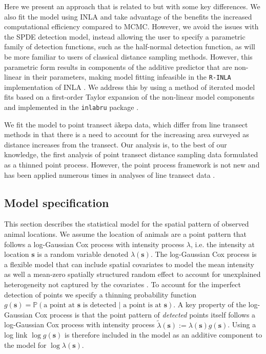 \documentclass{statsoc}
\newcommand{\bs}{\mathbf{s}}
\newcommand{\tl}{\tilde{\lambda}}   %
\newcommand{\akepa}{\textquotesingle\={a}kepa}  %
\begin{document}
Here we present an approach that is related to \citet{yuan_point_2017} but with some key differences. We also fit the model using INLA and take advantage of the benefits the increased computational efficiency compared to MCMC.  However, we avoid the issues with the SPDE detection model, instead allowing the user to specify a parametric family of detection functions, such as the half-normal detection function, as will be more familiar to users of classical distance sampling methods. However, this parametric form results in components of the additive predictor that are non-linear in their parameters, making model fitting infeasible in the \texttt{R-INLA} implementation of INLA \citep{rue_approximate_2009}.  We address this by using a method of iterated model fits based on a first-order Taylor expansion of the non-linear model components and implemented in the \texttt{inlabru} package \citep{bachl_inlabru_2019}.

We fit the model to point transect \akepa{} data, which differ from line transect methods in that there is a need to account for the increasing area surveyed as distance increases from the transect.  Our analysis is, to the best of our knowledge, the first analysis of point transect distance sampling data formulated as a thinned point process.  However, the point process framework is not new and has been applied numerous times in analyses of line transect data \citep{buckland_model-based_2016, niemi_bayesian_2010, johnson_model-based_2010, waagepetersen_likelihood-based_2006, hedley_spatial_2004,  hogmander_random_1991, stoyan_remark_1982}.

\subsection{Model specification}

This section describes the statistical model for the spatial pattern of observed animal locations. We assume the location of animals are a point pattern that follows a log-Gaussian Cox process with intensity process $\lambda$, i.e.  the intensity at location $\bs$ is a random variable denoted $\lambda(\bs)$.  The log-Gaussian Cox process is a flexible model that can include spatial covariates to model the mean intensity as well a mean-zero spatially structured random effect to account for unexplained heterogeneity not captured by the covariates \citep{moller_log_1998}.  To account for the imperfect detection of points we specify a thinning probability function $g(\bs) = \mathbb{P}(\text{a point at $\bs$ is detected } |\text{ a point is at $\bs$})$. A key property of the log-Gaussian Cox process is that the point pattern of \textit{detected} points itself follows a log-Gaussian Cox process with intensity process $\tl(\bs) := \lambda(\bs)g(\bs)$.  Using a log link $\log g(\bs)$ is therefore included in the model as an additive component to the model for $\log \lambda(\bs)$.  
\end{document}

